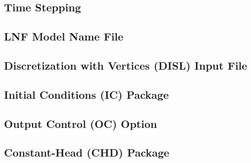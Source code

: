 \subsection{Time Stepping}


\newpage
\subsection{LNF Model Name File}


\newpage
\subsection{Discretization with Vertices (DISL) Input File}


\newpage
\subsection{Initial Conditions (IC) Package}


\newpage
\subsection{Output Control (OC) Option}


\newpage
\subsection{Constant-Head (CHD) Package}



